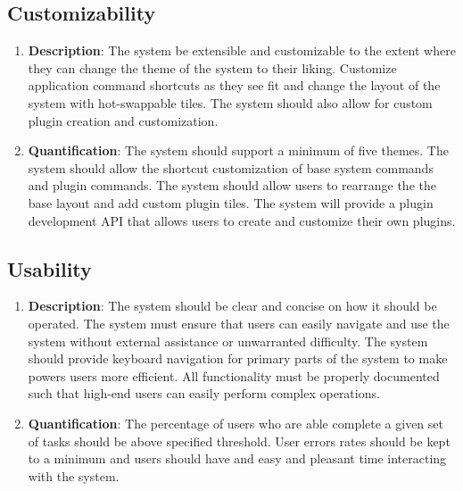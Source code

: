 \documentclass[11pt,a4paper]{article}
\begin{document}
\subsection{Customizability}
\begin{enumerate}[label*=\arabic*.]
	\item[\textbullet] {\bf Description}: The system be extensible and
	customizable to the extent where they can change the theme of the system to
	their liking. Customize application command shortcuts as they see fit and
	change the layout of the system with hot-swappable tiles. The system should
	also allow for custom plugin creation and customization.

	\item[\textbullet] {\bf Quantification}: The system should support a minimum
	of five themes. The system should allow the shortcut customization of base
	system commands and plugin commands. The system should allow users to
	rearrange the the base layout and add custom plugin tiles. The system will
	provide a plugin development API that allows users to create and customize
	their own plugins.
\end{enumerate}

\subsection{Usability} 
\begin{enumerate}[label*=\arabic*.]
	\item[\textbullet] {\bf Description}: The system should be clear and concise
	on how it should be operated. The system must ensure that users can easily
	navigate and use the system without external assistance or unwarranted
	difficulty. The system should provide keyboard navigation for primary parts
	of the system to make powers users more efficient. All functionality must be
	properly documented such that high-end users can easily perform complex
	operations.

	\item[\textbullet] {\bf Quantification}: The percentage of users who are
	able complete a given set of tasks should be above specified threshold. User
	errors rates should be kept to a minimum and users should have and easy and
	pleasant time interacting with the system. 
	
\end{enumerate}
\end{document}
